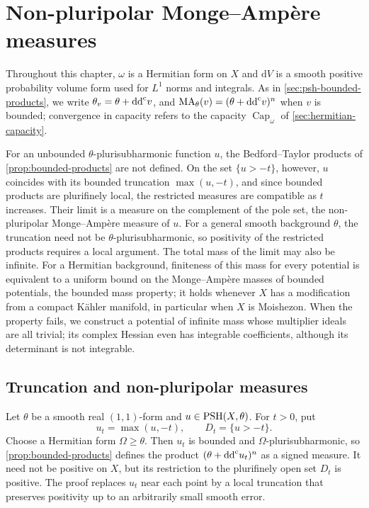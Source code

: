 \chapter{Non-pluripolar Monge--Amp\`ere measures}
\label{chap:products}

Throughout this chapter, $\omega$ is a Hermitian form on $X$ and $\mathrm{d}V$ is a smooth positive probability volume form used for $L^1$ norms and integrals. As in \cref{sec:psh-bounded-products}, we write $\theta_v=\theta+\mathrm{dd}^{\mathrm{c}} v$, and $\mathrm{MA}_\theta(v)=(\theta+\mathrm{dd}^{\mathrm{c}} v)^n$ when $v$ is bounded; convergence in capacity refers to the capacity $\operatorname{Cap}_\omega$ of \cref{sec:hermitian-capacity}.

For an unbounded $\theta$-plurisubharmonic function $u$, the Bedford--Taylor products of \cref{prop:bounded-products} are not defined. On the set $\{u>-t\}$, however, $u$ coincides with its bounded truncation $\max(u,-t)$, and since bounded products are plurifinely local, the restricted measures are compatible as $t$ increases. Their limit is a measure on the complement of the pole set, the non-pluripolar Monge--Amp\`ere measure of $u$. For a general smooth background $\theta$, the truncation need not be $\theta$-plurisubharmonic, so positivity of the restricted products requires a local argument. The total mass of the limit may also be infinite. For a Hermitian background, finiteness of this mass for every potential is equivalent to a uniform bound on the Monge--Amp\`ere masses of bounded potentials, the bounded mass property; it holds whenever $X$ has a modification from a compact K\"ahler manifold, in particular when $X$ is Moishezon. When the property fails, we construct a potential of infinite mass whose multiplier ideals are all trivial; its complex Hessian even has integrable coefficients, although its determinant is not integrable.

\section{Truncation and non-pluripolar measures}

Let $\theta$ be a smooth real $(1,1)$-form and $u\in\mathrm{PSH}(X,\theta)$. For $t>0$, put
\[
 u_t=\max(u,-t),\qquad D_t=\{u>-t\}.
\]
Choose a Hermitian form $\Omega\geq\theta$. Then $u_t$ is bounded and $\Omega$-plurisubharmonic, so \cref{prop:bounded-products} defines the product $(\theta+\mathrm{dd}^{\mathrm{c}} u_t)^n$ as a signed measure. It need not be positive on $X$, but its restriction to the plurifinely open set $D_t$ is positive. The proof replaces $u_t$ near each point by a local truncation that preserves positivity up to an arbitrarily small smooth error.

